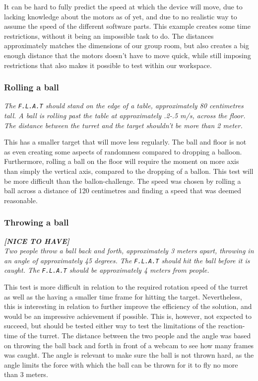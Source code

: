 It can be hard to fully predict the speed at which the device will move, due to lacking knowledge about the motors as of yet, and due to no realistic way to assume the speed of the different software parts.
This example creates some time restrictions, without it being an impossible task to do.
The distances approximately matches the dimensions of our group room, but also creates a big enough distance that the motors doesn't have to move quick, while still imposing restrictions that also makes it possible to test within our workspace.

\subsubsection{Rolling a ball}
\textit{The \texttt{F.L.A.T} should stand on the edge of a table, approximately 80 centimetres tall.
A ball is rolling past the table at approximately .2-.5 m/s, across the floor. 
The distance between the turret and the target shouldn't be more than 2 meter.}

This has a smaller target that will move less regularly.
The ball and floor is not as even creating some aspects of randomness compared to dropping a balloon.
Furthermore, rolling a ball on the floor will require the moment on more axis than simply the vertical axis, compared to the dropping of a ballon.
This test will be more difficult than the ballon-challenge.
The speed was chosen by rolling a ball across a distance of 120 centimetres and finding a speed that was deemed reasonable.

\subsubsection{Throwing a ball}
\textit{\textbf{[NICE TO HAVE]}}\\
\textit{Two people throw a ball back and forth, approximately 3 meters apart, throwing in an angle of approximately 45 degrees.
The \texttt{F.L.A.T} should hit the ball before it is caught.
The \texttt{F.L.A.T} should be approximately 4 meters from people.}

This test is more difficult in relation to the required rotation speed of the turret as well as the having a smaller time frame for hitting the target.
Nevertheless, this is interesting in relation to further improve the efficiency of the solution, and would be an impressive achievement if possible.
This is, however, not expected to succeed, but should be tested either way to test the limitations of the reaction-time of the turret.
The distance between the two people and the angle was based on throwing the ball back and forth in front of a webcam to see how many frames was caught.
The angle is relevant to make sure the ball is not thrown hard, as the angle limits the force with which the ball can be thrown for it to fly no more than 3 meters. 
